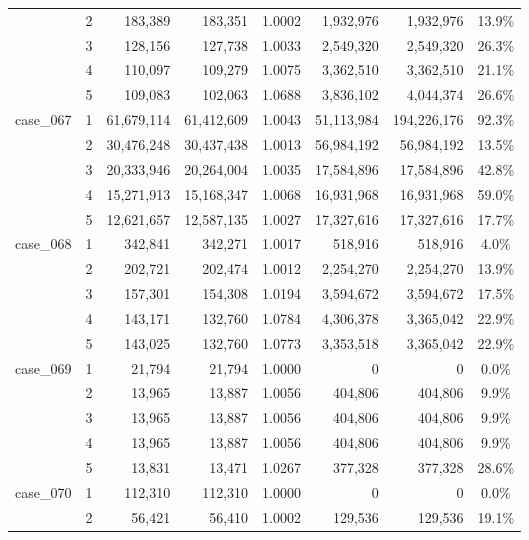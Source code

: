 \begin{footnotesize}
\begin{longtable}{l c rr c rr c}
 & 2 & 183{,}389 & 183{,}351 & 1.0002 & 1{,}932{,}976 & 1{,}932{,}976 & 13.9\% \\
 & 3 & 128{,}156 & 127{,}738 & 1.0033 & 2{,}549{,}320 & 2{,}549{,}320 & 26.3\% \\
 & 4 & 110{,}097 & 109{,}279 & 1.0075 & 3{,}362{,}510 & 3{,}362{,}510 & 21.1\% \\
 & 5 & 109{,}083 & 102{,}063 & 1.0688 & 3{,}836{,}102 & 4{,}044{,}374 & 26.6\% \\
\addlinespace[2pt]
case\_067 & 1 & 61{,}679{,}114 & 61{,}412{,}609 & 1.0043 & 51{,}113{,}984 & 194{,}226{,}176 & 92.3\% \\
 & 2 & 30{,}476{,}248 & 30{,}437{,}438 & 1.0013 & 56{,}984{,}192 & 56{,}984{,}192 & 13.5\% \\
 & 3 & 20{,}333{,}946 & 20{,}264{,}004 & 1.0035 & 17{,}584{,}896 & 17{,}584{,}896 & 42.8\% \\
 & 4 & 15{,}271{,}913 & 15{,}168{,}347 & 1.0068 & 16{,}931{,}968 & 16{,}931{,}968 & 59.0\% \\
 & 5 & 12{,}621{,}657 & 12{,}587{,}135 & 1.0027 & 17{,}327{,}616 & 17{,}327{,}616 & 17.7\% \\
\addlinespace[2pt]
case\_068 & 1 & 342{,}841 & 342{,}271 & 1.0017 & 518{,}916 & 518{,}916 & 4.0\% \\
 & 2 & 202{,}721 & 202{,}474 & 1.0012 & 2{,}254{,}270 & 2{,}254{,}270 & 13.9\% \\
 & 3 & 157{,}301 & 154{,}308 & 1.0194 & 3{,}594{,}672 & 3{,}594{,}672 & 17.5\% \\
 & 4 & 143{,}171 & 132{,}760 & 1.0784 & 4{,}306{,}378 & 3{,}365{,}042 & 22.9\% \\
 & 5 & 143{,}025 & 132{,}760 & 1.0773 & 3{,}353{,}518 & 3{,}365{,}042 & 22.9\% \\
\addlinespace[2pt]
case\_069 & 1 & 21{,}794 & 21{,}794 & 1.0000 & 0 & 0 & 0.0\% \\
 & 2 & 13{,}965 & 13{,}887 & 1.0056 & 404{,}806 & 404{,}806 & 9.9\% \\
 & 3 & 13{,}965 & 13{,}887 & 1.0056 & 404{,}806 & 404{,}806 & 9.9\% \\
 & 4 & 13{,}965 & 13{,}887 & 1.0056 & 404{,}806 & 404{,}806 & 9.9\% \\
 & 5 & 13{,}831 & 13{,}471 & 1.0267 & 377{,}328 & 377{,}328 & 28.6\% \\
\addlinespace[2pt]
case\_070 & 1 & 112{,}310 & 112{,}310 & 1.0000 & 0 & 0 & 0.0\% \\
 & 2 & 56{,}421 & 56{,}410 & 1.0002 & 129{,}536 & 129{,}536 & 19.1\% \\

\end{longtable}
\end{footnotesize}
